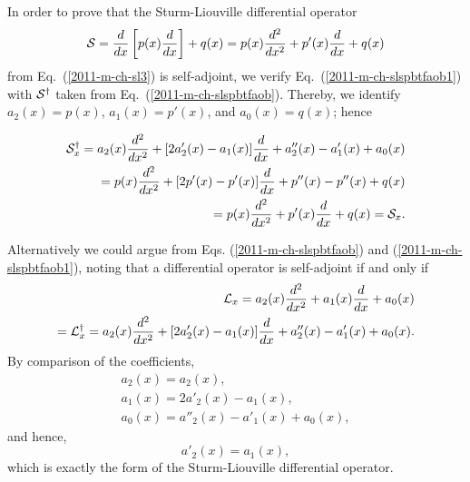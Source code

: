 {\color{OliveGreen}
\bproof

In order to prove that the  Sturm-Liouville differential operator
\begin{equation}
\begin{split}
{\cal S}
=       \frac{d}{dx}
\left[
p(x)
\frac{d}{dx}
\right]
+
q(x)
= p(x) \frac{d^2}{dx^2}
+p'(x) \frac{d}{dx}
+q(x)
\end{split}
\label{2011-m-ch-slspbtfaoc}
\end{equation}
from Eq.~(\ref{2011-m-ch-sl3})
is self-adjoint, we verify
Eq.~(\ref{2011-m-ch-slspbtfaob1})
with
${\cal S}^\dagger$
taken from
Eq.~(\ref{2011-m-ch-slspbtfaob}).
Thereby, we identify
$a_2(x) = p(x)$,
$a_1(x) = p'(x)$,
and
$a_0(x) = q(x)$; hence

\begin{equation}
\begin{split}
{\cal S}_x^\dagger
=a_2(x) \frac{d^2}{dx^2}
+
[2 a'_2(x)- a_1(x) ]  \frac{d}{dx}
+ a''_2(x)   - a'_1(x)   + a_0(x) \\
  =
p(x)  \frac{d^2}{dx^2}
+ [2 p'(x)-p'(x)] \frac{d}{dx}
+p''(x)-p''(x)+q(x) \\
  =
p(x)  \frac{d^2}{dx^2}
+ p'(x) \frac{d}{dx}
+q(x)  = {\cal S}_x
.
\end{split}
\end{equation}

Alternatively we could argue from Eqs. (\ref{2011-m-ch-slspbtfaob}) and (\ref{2011-m-ch-slspbtfaob1}),
noting that
a differential operator is self-adjoint if and only if
\begin{equation}
\begin{split}
 {\cal L}_x
=a_2(x) \frac{d^2}{dx^2}   +  a_1(x)\frac{d }{dx }    + a_0(x) \\
=   {\cal L}_x^\dagger =
 a_2(x) \frac{d^2}{dx^2}
+
[2 a'_2(x)- a_1(x) ]  \frac{d}{dx}
+ a''_2(x)   - a'_1(x)   + a_0(x)
.
\end{split}
\end{equation}
By comparison of the coefficients,
\begin{equation}
\begin{split}
a_2(x)=a_2(x),\\
a_1(x) =
2 a'_2(x)- a_1(x)   ,\\
a_0(x) =
 a''_2(x)   - a'_1(x)   + a_0(x)
,
\end{split}
\end{equation}
and hence,
\begin{equation}
 a'_2(x)= a_1(x),
\end{equation}
which is exactly the form of the   Sturm-Liouville differential operator.

\eproof
}


